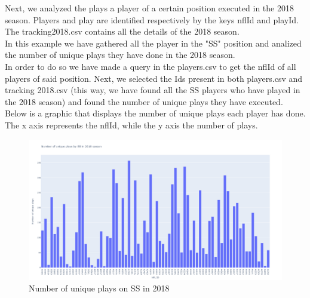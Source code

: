 \documentclass{article}
\begin{document}
Next, we analyzed the plays a player of a certain position executed in the 2018 season.  Players and play are identified respectively by the keys nflId and playId. The tracking2018.csv contains all the details of the 2018 season.\\
In this example we have gathered all the player in the "SS" position and analized the number of unique plays they have done in the 2018 season.\\ In order to do so we have made a query in the players.csv to get the nflId of all players of said position. Next, we selected the Ids present in both players.csv and tracking 2018.csv (this way, we have found all the SS players who have played in the 2018 season) and found the number of unique plays they have executed. Below is a graphic that displays the number of unique plays each player has done. The x axis represents the nflId, while the y axis the number of plays.
\begin{figure}[H]
	\includegraphics[width=\linewidth,height=\textheight,keepaspectratio]{SS_unique_plays_2018.png}
	\caption{Number of unique plays on SS in 2018}
\end{figure}
\end{document}

